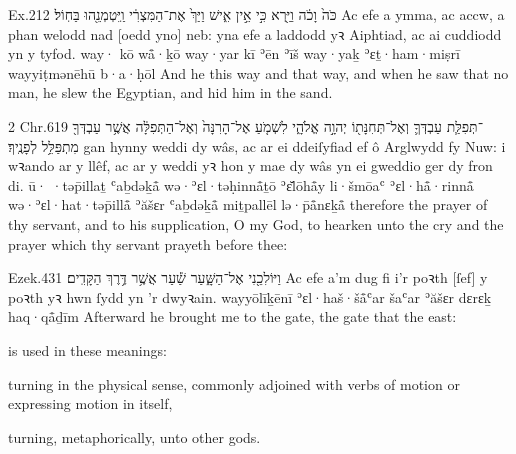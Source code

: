 \begin{example}{Ex.}{2}{12}{}{}
	\quoling
	{ כֹּה֙ וָכֹ֔ה וַיַּ֖רְא כִּ֣י אֵ֣ין אִ֑ישׁ וַיַּךְ֙ אֶת־הַמִּצְרִ֔י וַֽיִּטְמְנֵ֖הוּ בַּחֽוֹל׃}
	{Ac efe a  ymma, ac accw, a phan welodd nad [oedd yno] neb: yna efe a laddodd yꝛ Aiphtiad, ac ai cuddiodd yn y tyfod.}
	{way· kō wå̄·ḵō way·yar kī ʾēn ʾīš way·yaḵ ʾɛṯ·ham·miṣrī wayyiṭmənēhū b·a·ḥōl}
	{And he  this way and that way, and when he saw that  no man, he slew the Egyptian, and hid him in the sand.}
\end{example}

\begin{example}{2 Chr.}{6}{19}{}{}
	\quoling
	{ ־תְּפִלַּ֧ת עַבְדְּךָ֛ וְאֶל־תְּחִנָּת֖וֹ יְהוָ֣ה אֱלֹהָ֑י לִשְׁמֹ֤עַ אֶל־הָרִנָּה֙ וְאֶל־הַתְּפִלָּ֔ה אֲשֶׁ֥ר עַבְדְּךָ֖ מִתְפַּלֵּ֥ל לְפָנֶֽיךָ׃}
	{ gan hynny  weddi dy wâs, ac ar ei ddeiſyfiad ef ô Arglwydd fy Nuw: i wꝛando ar y llêf, ac ar y weddi yꝛ hon y mae dy wâs yn ei gweddio ger dy fron di.}
	{ū· ·təp̄illaṯ ʿaḇdəḵå̄ wə·ʾɛl·təḥinnå̄ṯō {\YHWH} ʾɛ̆lōhå̄y li·šmōaʿ ʾɛl·hå̄·rinnå̄ wə·ʾɛl·hat·təp̄illå̄ ʾăšɛr ʿaḇdəḵå̄ miṯpallēl lə·p̄å̄nɛḵå̄}
	{ therefore  the prayer of thy servant, and to his supplication, O {\LORD} my God, to hearken unto the cry and the prayer which thy servant prayeth before thee:}
\end{example}

\begin{example}{Ezek.}{43}{1}{}{}
	\quoling
	{וַיּוֹלִכֵ֖נִי אֶל־הַשָּׁ֑עַר שַׁ֕עַר אֲשֶׁ֥ר  דֶּ֥רֶךְ הַקָּדִֽים׃}
	{Ac efe a’m dug fi i’r poꝛth [ſef] y poꝛth yꝛ hwn ſydd yn   ’r dwyꝛain.}
	{wayyōlīḵēnī ʾɛl·haš·šå̄ʿar šaʿar ʾăšɛr  dɛrɛḵ haq·qå̄ḏīm}
	{Afterward he brought me to the gate,  the gate that   the east:}
\end{example}

\begin{paper}
	 is used in these meanings:
	\begin{compactitem}
		\item turning in the physical sense, commonly adjoined with verbs of motion or expressing motion in itself,
		\item turning, metaphorically, unto other gods.
	\end{compactitem}
\end{paper}

